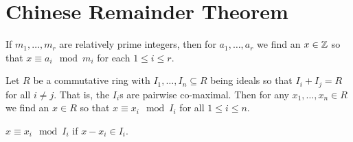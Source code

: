\section{Chinese Remainder Theorem}

\begin{theorem}
	If \(m_1, \ldots, m_{r}\) are relatively prime integers, then for \(a_1, \ldots, a_{r}\) we find an \(x \in \mathbb{Z}\) so that \(x \equiv a_{i} \mod m_{i}\) for each \(1 \le i \le r\).
\end{theorem}
\begin{theorem}
Let \(R\) be a commutative ring with \(I_1, \ldots, I_{n} \subseteq R\)	being ideals so that \(I_{i} + I_{j} = R\) for all \(i \neq j\). That is, the \(I_{i}\)s are pairwise co-maximal. Then for any \(x_1, \ldots, x_{n} \in R\) we find an \(x \in R\) so that \(x \equiv x_{i} \mod I_{i}\) for all \(1 \le i \le n\).
\end{theorem}
\begin{recall}
	\(x \equiv x_{i} \mod I_{i}\) if \(x - x_{i} \in I_{i}\).
\end{recall}
